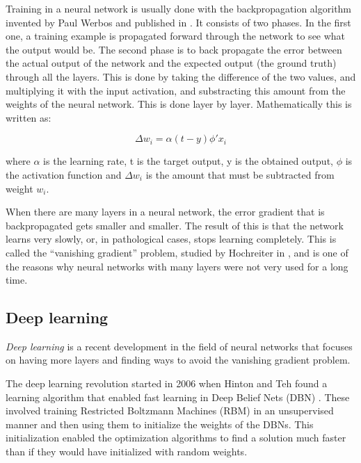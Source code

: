 Training in a neural network is usually done with the backpropagation algorithm invented by Paul Werbos and published in \cite{werbos1974beyond}. It consists of two phases. In the first one, a training example is propagated forward through the network to see what the output would be. The second phase is to back propagate the error between the actual output of the network and the expected output (the ground truth) through all the layers. This is done by taking the difference of the two values, and multiplying it with the input activation, and substracting this amount from the weights of the neural network. This is done layer by layer. Mathematically this is written as:

\[
 \Delta w_i = \alpha (t - y) \phi' x_i 
\]

where $\alpha$ is the learning rate, t is the target output, y is the obtained output,  $ \phi $ is the activation function and $ \Delta w_i $ is the amount that must be subtracted from weight $ w_i $. 

When there are many layers in a neural network, the error gradient that is backpropagated gets smaller and smaller. The result of this is that the network learns very slowly, or, in pathological cases, stops learning completely. This is called the ``vanishing gradient'' problem,  studied by Hochreiter in \cite{hochreiter1998vanishing}, and is one of the reasons why neural networks with many layers were not very used for a long time. 

\subsection{Deep learning}

\textit{Deep learning} is a recent development in the field of neural networks that focuses on having more layers and finding ways to avoid the vanishing gradient problem.

The deep learning revolution started in 2006 when Hinton and Teh found a learning algorithm that enabled fast learning in Deep Belief Nets (DBN) \cite{hinton2006fast}. These involved training Restricted Boltzmann Machines (RBM) in an unsupervised manner and then using them to initialize the weights of the DBNs. This initialization enabled the optimization algorithms to find a solution much faster than if they would have initialized with random weights.


